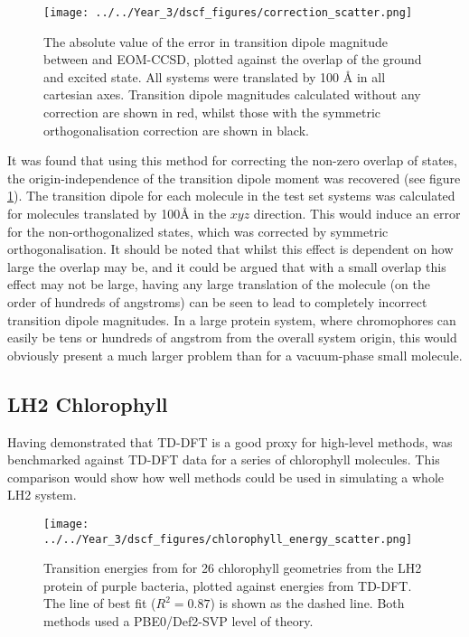 \begin{figure}
\centering
\texttt{[image: ../../Year\_3/dscf\_figures/correction\_scatter.png]}
\caption{The absolute value of the error in transition dipole magnitude between
\dscf and EOM-CCSD, plotted against the \dscf overlap of the ground and excited
state. All systems were translated by 100 \AA{} in all cartesian axes. Transition
dipole magnitudes calculated without any correction are shown in red, whilst
those with the symmetric orthogonalisation correction are shown in black.}
\label{fig:correction_scatter}
\end{figure}

It was found that using this method for correcting the non-zero overlap of states, 
the origin-independence of the transition dipole moment was recovered (see figure
\ref{fig:correction_scatter}).
The transition dipole for each molecule in the test set systems was calculated
for molecules translated by 100\AA{} in the $xyz$ direction.
This would induce an error for the non-orthogonalized states, which was corrected 
by symmetric orthogonalisation. It should be noted that whilst this effect is dependent
on how large the overlap may be, and it could be argued that with a small overlap 
this effect may not be large, having any large translation of the molecule (on the order of hundreds of angstroms) 
can be seen to lead to completely incorrect transition dipole magnitudes. In a
large protein system, where chromophores can easily be tens or hundreds of angstrom
from the overall system origin, this would obviously present a much larger problem 
than for a vacuum-phase small molecule.

\subsection{LH2 Chlorophyll}
\label{subsec:dscf_chl_tests}
Having demonstrated that TD-DFT is a good proxy for high-level methods, \dscf was
benchmarked against TD-DFT data for a series of chlorophyll molecules. This comparison 
would show how well \dscf methods could be used in simulating a whole LH2 system.

\begin{figure}
\centering
\texttt{[image: ../../Year\_3/dscf\_figures/chlorophyll\_energy\_scatter.png]}
\caption{Transition energies from \dscf for 26 chlorophyll geometries from the LH2
protein of purple bacteria,  plotted against energies from TD-DFT. The line of
best fit ($R^2=0.87$) is shown as the dashed line. Both methods used a PBE0/Def2-SVP 
level of theory.}
\label{fig:chl_energy}
\end{figure}

